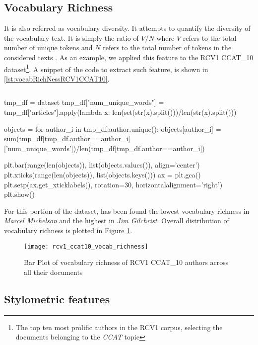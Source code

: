 \subsection{Vocabulary Richness}
It is also referred as vocabulary diversity. It attempts to quantify the diversity of the vocabulary text. It is simply the ratio of $V / N$ where $V$ refers to the total number of unique tokens and $N$ refers to the total number of tokens in the considered texts \cite{stamatatos2009survey}. As an example, we applied this feature to the RCV1 CCAT\_10 dataset\footnote{The top ten most prolific authors in the RCV1 corpus, selecting the documents belonging to the \textit{CCAT} topic}.
A snippet of the code to extract such feature, is shown in \ref{lst:vocabRichNessRCV1CCAT10}.

\begin{lstlisting}[frame=none,caption={Calculate vocabulary richness in RCV1 CCAT10 dataset},captionpos=b,label=lst:vocabRichNessRCV1CCAT10]
\end{lstlisting}
\begin{python}	
		tmp_df = dataset
		tmp_df["num_unique_words"] = tmp_df["articles"].apply(lambda x: len(set(str(x).split()))/len(str(x).split()))
		
		objects = {}
		for author_i in tmp_df.author.unique():
			objects[author_i] = sum(tmp_df[tmp_df.author==author_i]['num_unique_words'])/len(tmp_df[tmp_df.author==author_i])
		
		plt.bar(range(len(objects)), list(objects.values()), align='center')
		plt.xticks(range(len(objects)), list(objects.keys()))
		ax = plt.gca()
		plt.setp(ax.get_xticklabels(), rotation=30, horizontalalignment='right')
		plt.show()
\end{python}

For this portion of the dataset, has been found the lowest vocabulary richness in \textit{Marcel Michelson} and the highest in \textit{Jim Gilchrist}.
Overall distribution of
vocabulary richness is plotted in Figure \ref{fig:rcv1_ccat10_vocab_richness}.

\begin{figure}[ht]
	\centering
	\texttt{[image: rcv1\_ccat10\_vocab\_richness]}
	\caption[Vocabularity Richness RCV1 CCAT\_10]{Bar Plot of vocabulary richness of RCV1 CCAT\_10 authors across all their documents}
	\label{fig:rcv1_ccat10_vocab_richness}
\end{figure}

\subsection{Stylometric features}

